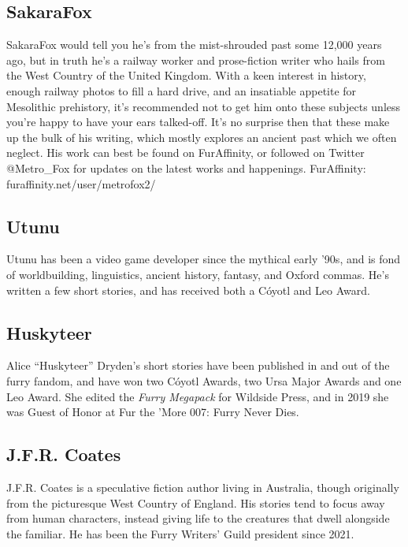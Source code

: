\subsection*{SakaraFox}
SakaraFox would tell you he’s from the mist-shrouded past some 12,000 years ago, but in truth he’s a railway worker and prose-fiction writer who hails from the West Country of the United Kingdom. With a keen interest in history, enough railway photos to fill a hard drive, and an insatiable appetite for Mesolithic prehistory, it’s recommended not to get him onto these subjects unless you’re happy to have your ears talked-off. It’s no surprise then that these make up the bulk of his writing, which mostly explores an ancient past which we often neglect. His work can best be found on FurAffinity, or followed on Twitter @Metro\_Fox for updates on the latest works and happenings. FurAffinity: furaffinity.net/user/metrofox2/

\subsection*{Utunu}
Utunu has been a video game developer since the mythical early '90s, and is fond of worldbuilding, linguistics, ancient history, fantasy, and Oxford commas. He's written a few short stories, and has received both a Cóyotl and Leo Award.

\subsection*{Huskyteer}
Alice ``Huskyteer'' Dryden's short stories have been published in and out of the furry fandom, and have won two Cóyotl Awards, two Ursa Major Awards and one Leo Award. She edited the \emph{Furry Megapack} for Wildside Press, and in 2019 she was Guest of Honor at Fur the 'More 007: Furry Never Dies.

\subsection*{J.F.R. Coates}

J.F.R. Coates is a speculative fiction author living in Australia, though originally from the picturesque West Country of England. His stories tend to focus away from human characters, instead giving life to the creatures that dwell alongside the familiar. He has been the Furry Writers' Guild president since 2021.

